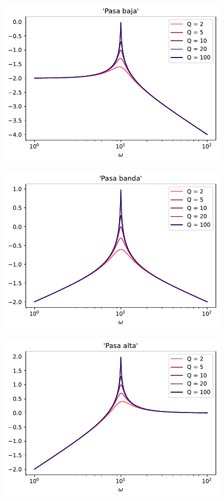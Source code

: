 \documentclass[11pt]{article} %
\begin{document}
\begin{figure}[h!] \centering
\includegraphics[scale=1]{Bode_1.pdf}
\end{figure}

\begin{figure}[h!] \centering
\includegraphics[scale=1]{Bode_2.pdf}
\end{figure}

\newpage

\begin{figure}[h!] \centering
\includegraphics[scale=1]{Bode_3.pdf}
\end{figure}
\end{document}
